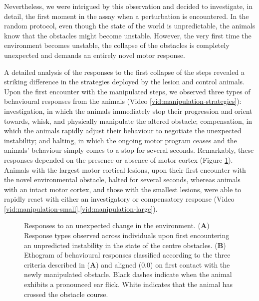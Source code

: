 Nevertheless, we were intrigued by this observation and decided to investigate, in detail, the first moment in the assay when a perturbation is encountered. In the random protocol, even though the state of the world is unpredictable, the animals know that the obstacles might become unstable. However, the very first time the environment becomes unstable, the collapse of the obstacles is completely unexpected and demands an entirely novel motor response.

A detailed analysis of the responses to the first collapse of the steps revealed a striking difference in the strategies deployed by the lesion and control animals. Upon the first encounter with the manipulated steps, we observed three types of behavioural responses from the animals (Video \ref{vid:manipulation-strategies}): investigation, in which the animals immediately stop their progression and orient towards, whisk, and physically manipulate the altered obstacle; compensation, in which the animals rapidly adjust their behaviour to negotiate the unexpected instability; and halting, in which the ongoing motor program ceases and the animals' behaviour simply comes to a stop for several seconds. Remarkably, these responses depended on the presence or absence of motor cortex (Figure \ref{fig:ethogram}). Animals with the largest motor cortical lesions, upon their first encounter with the novel environmental obstacle, halted for several seconds, whereas animals with an intact motor cortex, and those with the smallest lesions, were able to rapidly react with either an investigatory or compensatory response (Video \ref{vid:manipulation-small},\ref{vid:manipulation-large}).

\begin{figure}
\centering

\caption{Responses to an unexpected change in the environment. (\textbf{A}) Response types observed across individuals upon first encountering an unpredicted instability in the state of the centre obstacles. (\textbf{B}) Ethogram of behavioural responses classified according to the three criteria described in (\textbf{A}) and aligned (0.0) on first contact with the newly manipulated obstacle. Black dashes indicate when the animal exhibits a pronounced ear flick. White indicates that the animal has crossed the obstacle course.}
\label{fig:ethogram}
\end{figure}

